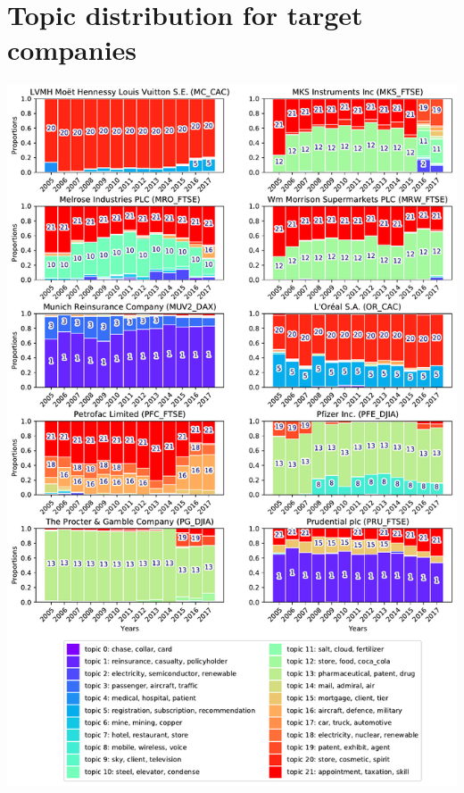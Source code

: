 \documentclass[12pt,journal,letterpaper,oneside,onecolumn]{IEEEtran}
\begin{document}
\section{Topic distribution for target companies}
\begin{center}
\includegraphics[width=0.85\linewidth]{images/companies_on_page_4.pdf}
\end{center}
\end{document}
